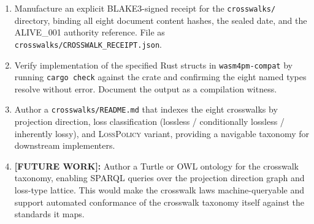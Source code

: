 \begin{enumerate}
  \item Manufacture an explicit \textsc{BLAKE3}-signed receipt for the \texttt{crosswalks/}
        directory, binding all eight document content hashes, the sealed date, and the
        \textsc{ALIVE\_001} authority reference. File as
        \texttt{crosswalks/CROSSWALK\_RECEIPT.json}.

  \item Verify implementation of the specified Rust structs in \texttt{wasm4pm-compat} by
        running \texttt{cargo check} against the crate and confirming the eight named types
        resolve without error. Document the output as a compilation witness.

  \item Author a \texttt{crosswalks/README.md} that indexes the eight crosswalks by projection
        direction, loss classification (lossless / conditionally lossless / inherently lossy),
        and \textsc{LossPolicy} variant, providing a navigable taxonomy for downstream
        implementers.

  \item \textbf{[FUTURE WORK]:} Author a Turtle or \textsc{OWL} ontology for the crosswalk
        taxonomy, enabling \textsc{SPARQL} queries over the projection direction graph and
        loss-type lattice. This would make the crosswalk laws machine-queryable and support
        automated conformance of the crosswalk taxonomy itself against the standards it maps.
\end{enumerate}
